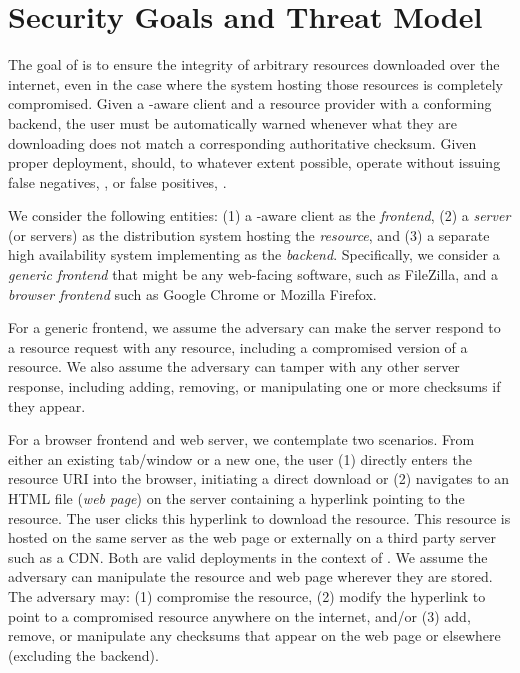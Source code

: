 \section{Security Goals and Threat Model} \label{sec:model}

The goal of \SYSTEM{} is to ensure the integrity of arbitrary resources
downloaded over the internet, even in the case where the system hosting those
resources is completely compromised. Given a \SYSTEM{}-aware client and a
resource provider with a conforming backend, the user must be automatically
warned whenever what they are downloading does not match a corresponding
authoritative checksum. Given proper deployment, \SYSTEM{} should, to whatever
extent possible, operate without issuing false negatives, , or false positives, .

We consider the following entities: (1) a \SYSTEM{}-aware client as the
\emph{frontend}, (2) a \emph{server} (or servers) as the distribution system
hosting the \emph{resource}, and (3) a separate high availability system
implementing \SYSTEM{} as the \emph{backend}. Specifically, we consider a
\emph{generic frontend} that might be any web-facing software, such as
FileZilla, and a \emph{browser frontend} such as Google Chrome or Mozilla
Firefox.

For a generic frontend, we assume the adversary can make the server respond to a
resource request with any resource, including a compromised version of a
resource. We also assume the adversary can tamper with any other server
response, including adding, removing, or manipulating one or more checksums if
they appear.

For a browser frontend and web server, we contemplate two scenarios. From either
an existing tab/window or a new one, the user (1) directly enters the resource
URI into the browser, initiating a direct download or (2) navigates to an HTML
file (\emph{web page}) on the server containing a hyperlink pointing to the
resource. The user clicks this hyperlink to download the resource. This resource
is hosted on the same server as the web page or externally on a third party
server such as a CDN. Both are valid deployments in the context of \SYSTEM{}. We
assume the adversary can manipulate the resource and web page wherever they are
stored. The adversary may: (1) compromise the resource, (2) modify the hyperlink
to point to a compromised resource anywhere on the internet, and/or (3) add,
remove, or manipulate any checksums that appear on the web page or elsewhere
(excluding the backend).

